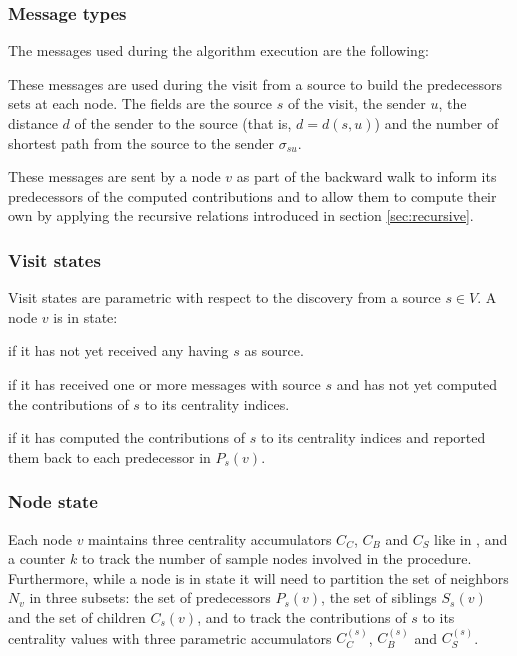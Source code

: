 \subsubsection{Message types}

The messages used during the algorithm execution are the following:

\begin{description}[leftmargin=0cm]
\item[\mdiscargs{s}{u}{d}] These messages are used during the visit from a source to build the predecessors sets at each node. The fields are the source $s$ of the visit, the sender $u$, the distance $d$ of the sender to the source (that is, $d = d(s,u)$) and the number of shortest path from the source to the sender $\sigma_{su}$.

\item[\mrepargs{s}{v}] These messages are sent by a node $v$ as part of the backward walk to inform its predecessors of the computed contributions and to allow them to compute their own by applying the recursive relations introduced in section \ref{sec:recursive}.
\end{description}

\subsubsection{Visit states}

Visit states are parametric with respect to the discovery from a source $s \in V$. A node $v$ is in state:
\begin{description}[leftmargin=0cm]
\item[\swait{s}] if it has not yet received any \mdisc{} having $s$ as source.
\item[\sact{s}] if it has received one or more \mdisc{} messages with source $s$ and has not yet computed the contributions of $s$ to its centrality indices.
\item[\scomp{s}] if it has computed the contributions of $s$ to its centrality indices and reported them back to each predecessor in $P_s(v)$.
\end{description}

\subsubsection{Node state}
Each node $v$ maintains three centrality accumulators $C_C$, $C_B$ and $C_S$ like in \deccen{}, and a counter $k$ to track the number of sample nodes involved in the procedure. Furthermore, while a node is in state  it will need to partition the set of neighbors $N_v$ in three subsets: the set of predecessors $P_s(v)$, the set of siblings $S_s(v)$ and the set of children $C_s(v)$, and to track the contributions of $s$ to its centrality values with three parametric accumulators $C_C^{(s)}$, $C_B^{(s)}$ and $C_S^{(s)}$.

